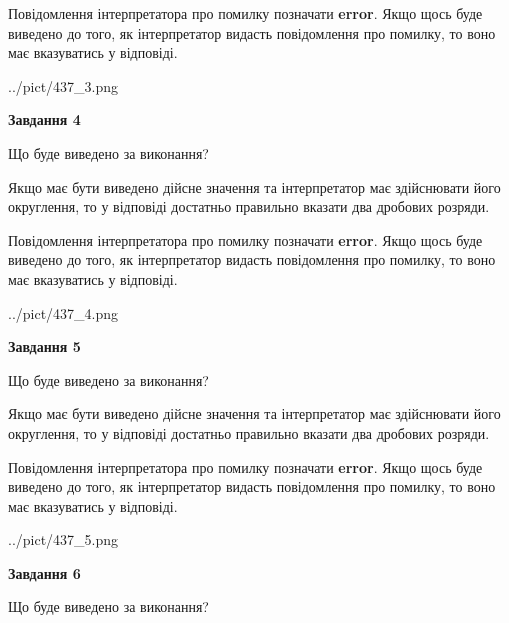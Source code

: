 \documentclass[12pt, ukrainian]{article}
\begin{document}
{\begin {Large}
Повідомлення інтерпретатора про помилку позначати \textbf{error}.
Якщо щось буде виведено до того, як інтерпретатор видасть повідомлення про помилку, 
то воно має вказуватись у відповіді. \par

\begin{center}
	{../pict/437_3.png}
\end{center}
\newpage

{\begin {center}\textbf{Завдання 4}\end {center}}\par
Що буде виведено за виконання? \par

Якщо має бути виведено дійсне значення та інтерпретатор має здійснювати його округлення, 
то у відповіді достатньо правильно вказати два дробових розряди.

Повідомлення інтерпретатора про помилку позначати \textbf{error}.
Якщо щось буде виведено до того, як інтерпретатор видасть повідомлення про помилку, 
то воно має вказуватись у відповіді. \par

\begin{center}
	{../pict/437_4.png}
\end{center}
\newpage

{\begin {center}\textbf{Завдання 5}\end {center}}\par
Що буде виведено за виконання? \par

Якщо має бути виведено дійсне значення та інтерпретатор має здійснювати його округлення, 
то у відповіді достатньо правильно вказати два дробових розряди.

Повідомлення інтерпретатора про помилку позначати \textbf{error}.
Якщо щось буде виведено до того, як інтерпретатор видасть повідомлення про помилку, 
то воно має вказуватись у відповіді. \par

\begin{center}
	{../pict/437_5.png}
\end{center}
\newpage

{\begin {center}\textbf{Завдання 6}\end {center}}\par
Що буде виведено за виконання? \par


\end{Large}}
\end{document}
